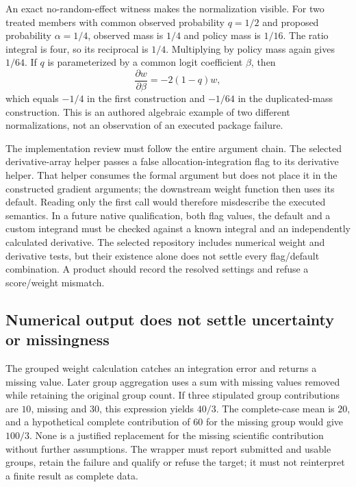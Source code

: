 An exact no-random-effect witness makes the normalization visible. For two
treated members with common observed probability $q=1/2$ and proposed
probability $\alpha=1/4$, observed mass is $1/4$ and policy mass is $1/16$.
The ratio integral is four, so its reciprocal is $1/4$. Multiplying by policy
mass again gives $1/64$. If $q$ is parameterized by a common logit coefficient
$\beta$, then
\[
 \frac{\partial w}{\partial\beta}=-2(1-q)w,
\]
which equals $-1/4$ in the first construction and $-1/64$ in the duplicated-mass
construction. This is an authored algebraic example of two different
normalizations, not an observation of an executed package failure.
\citep{exec24_interference_reference}

The implementation review must follow the entire argument chain. The selected
derivative-array helper passes a false allocation-integration flag to its
derivative helper. That helper consumes the formal argument but does not place
it in the constructed gradient arguments; the downstream weight function then
uses its default. Reading only the first call would therefore misdescribe the
executed semantics. In a future native qualification, both flag values, the
default and a custom integrand must be checked against a known integral and an
independently calculated derivative. The selected repository includes numerical
weight and derivative tests, but their existence alone does not settle every
flag/default combination. A product should record the resolved settings and
refuse a score/weight mismatch.
\citep{exec24_interference_inferference}

\subsection{Numerical output does not settle uncertainty or missingness}
The grouped weight calculation catches an integration error and returns a
missing value. Later group aggregation uses a sum with missing values removed
while retaining the original group count. If three stipulated group
contributions are $10$, missing and $30$, this expression yields $40/3$. The
complete-case mean is $20$, and a hypothetical complete contribution of $60$
for the missing group would give $100/3$. None is a justified replacement for
the missing scientific contribution without further assumptions. The wrapper
must report submitted and usable groups, retain the failure and qualify or
refuse the target; it must not reinterpret a finite result as complete data.
\citep{exec24_interference_inferference,exec24_interference_reference}

